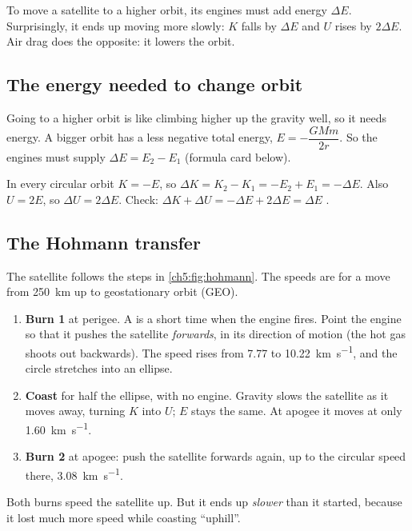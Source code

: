 \begin{bigidea}
To move a satellite to a higher orbit, its engines must add energy $\Delta E$.
Surprisingly, it ends up moving more slowly: $K$ falls by $\Delta E$ and $U$ rises
by $2\Delta E$. Air drag does the opposite: it lowers the orbit.
\end{bigidea}

\begin{keywords}
\end{keywords}

\subsection{The energy needed to change orbit}

Going to a higher orbit is like climbing higher up the gravity well, so it needs
energy. A bigger orbit has a less negative total energy, $E = -\dfrac{GMm}{2r}$.
So the engines must supply $\Delta E = E_2 - E_1$ (formula card below).

In every circular orbit $K = -E$, so
$\Delta K = K_2 - K_1 = -E_2 + E_1 = -\Delta E$. Also $U = 2E$, so
$\Delta U = 2\Delta E$. Check: $\Delta K + \Delta U = -\Delta E + 2\Delta E =
\Delta E$ \cmark.

\subsection{The Hohmann transfer}

The satellite follows the steps in \cref{ch5:fig:hohmann}. The speeds are for a
move from \qty{250}{km} up to geostationary orbit (GEO).
\begin{enumerate}
  \item \textbf{Burn 1} at perigee. A  is a short time when the
        engine fires. Point the engine so that it pushes the satellite
        \emph{forwards}, in its direction of motion (the hot gas shoots out
        backwards). The speed rises from 7.77 to \qty{10.22}{km.s^{-1}}, and the
        circle stretches into an ellipse.
  \item \textbf{Coast} for half the ellipse, with no engine. Gravity slows the
        satellite as it moves away, turning $K$ into $U$; $E$ stays the same. At
        apogee it moves at only \qty{1.60}{km.s^{-1}}.
  \item \textbf{Burn 2} at apogee: push the satellite forwards again, up to the
        circular speed there, \qty{3.08}{km.s^{-1}}.
\end{enumerate}
Both burns speed the satellite up. But it ends up \emph{slower} than it started,
because it lost much more speed while coasting ``uphill''.


